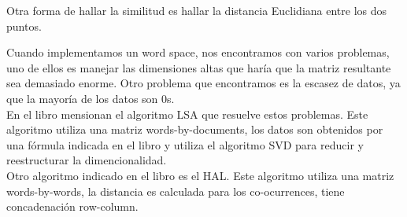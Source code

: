 \documentclass[a4paper,12pt]{article}
\begin{document}
  Otra forma de hallar la similitud es hallar la distancia Euclidiana entre los dos puntos. \par
  Cuando implementamos un word space, nos encontramos con varios problemas, uno de ellos es manejar las dimensiones altas que haría
  que la matriz resultante sea demasiado enorme. Otro problema que encontramos es la escasez de datos, ya que la mayoría de los datos
  son 0s.\\
  En el libro mensionan el algoritmo LSA que resuelve estos problemas. Este algoritmo utiliza una matriz words-by-documents, los datos son
  obtenidos por una fórmula indicada en el libro y utiliza el algoritmo SVD para reducir y reestructurar la dimencionalidad. \\
  Otro algoritmo indicado en el libro es el HAL. Este algoritmo utiliza una matriz words-by-words, la distancia es calculada para los co-ocurrences,
  tiene concadenación row-column.
  
\end{document}
